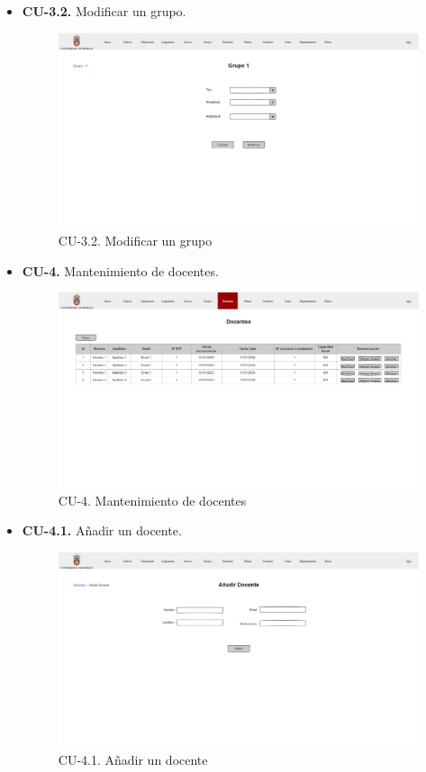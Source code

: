 \begin{itemize}
	\item \textbf{CU-3.2.} Modificar un grupo.
	\begin{figure}[!h]
		\centering
		\includegraphics[width=\textwidth]{../img/Anexos/Vistas/mod_grupo.png}
		\caption{CU-3.2. Modificar un grupo}\label{fig:../img/Anexos/Vistas/mod_grupo.png}
	\end{figure}
	
	\item \textbf{CU-4.} Mantenimiento de docentes.
	\begin{figure}[!h]
		\centering
		\includegraphics[width=\textwidth]{../img/Anexos/Vistas/docentes.png}
		\caption{CU-4. Mantenimiento de docentes}\label{fig:../img/Anexos/Vistas/docentes.png}
	\end{figure}
	
	\item \textbf{CU-4.1.} Añadir un docente.
	\begin{figure}[!h]
		\centering
		\includegraphics[width=\textwidth]{../img/Anexos/Vistas/add_docente.png}
		\caption{CU-4.1. Añadir un docente}\label{fig:../img/Anexos/Vistas/add_docente.png}
	\end{figure}
	

\end{itemize}
